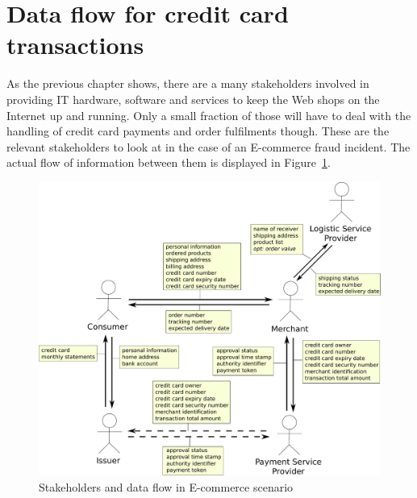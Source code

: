 
\section{Data flow for credit card transactions}
\label{sec:stakeholder_data_flow}

As the previous chapter shows, there are a many stakeholders involved in providing \gls{IT} hardware, software and services to keep the Web shops on the Internet up and running. Only a small fraction of those will have to deal with the handling of credit card payments and order fulfilments though. These are the relevant stakeholders to look at in the case of an \gls{E-commerce} fraud incident. The actual flow of information between them is displayed in  Figure~\ref{fig:images_e_commerce_stakeholder}. \@

\begin{figure}[H]
	\centering
		\includegraphics[width=0.9\columnwidth]{images/e-commerce-stakeholder.pdf}
	\caption{Stakeholders and data flow in \gls{E-commerce} scenario}
\label{fig:images_e_commerce_stakeholder}
\end{figure}
